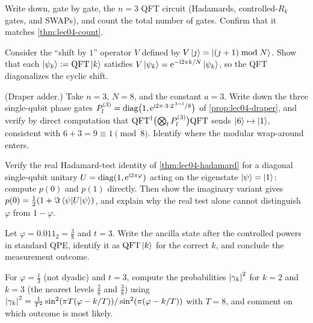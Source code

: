 \begin{exercise}\label{ex:lec04-4}
Write down, gate by gate, the $n=3$ QFT circuit (Hadamards, controlled-$R_k$
gates, and SWAPs), and count the total number of gates. Confirm that it matches
\cref{thm:lec04-count}.
\end{exercise}

\begin{exercise}\label{ex:lec04-5}
Consider the ``shift by $1$'' operator $V$ defined by
$V\ket{j}=\ket{(j+1)\bmod N}$. Show that each $\ket{\psi_k}\vcentcolon=\mathrm{QFT}\ket{k}$
satisfies $V\ket{\psi_k}=\mathrm{e}^{-\mathrm{i} 2\pi k/N}\ket{\psi_k}$, so the QFT
diagonalizes the cyclic shift.
\end{exercise}

\begin{exercise}\label{ex:lec04-draper}
(Draper adder.) Take $n=3$, $N=8$, and the constant $a=3$. Write down the three
single-qubit phase gates $P_l^{(3)}=\operatorname{diag}\bigl(1,\mathrm{e}^{\mathrm{i} 2\pi\cdot 3\cdot
2^{\,3-l}/8}\bigr)$ of \cref{prop:lec04-draper}, and verify by direct computation
that $\mathrm{QFT}^{\dagger}\bigl(\bigotimes_{l}P_l^{(3)}\bigr)\mathrm{QFT}$ sends
$\ket{6}\mapsto\ket{1}$, consistent with $6+3=9\equiv1\pmod 8$. Identify where the
modular wrap-around enters.
\end{exercise}

\begin{exercise}\label{ex:lec04-6}
Verify the real Hadamard-test identity of \cref{thm:lec04-hadamard} for a
diagonal single-qubit unitary $U=\operatorname{diag}(1,\mathrm{e}^{\mathrm{i} 2\pi\varphi})$ acting on the
eigenstate $\ket{\psi}=\ket{1}$: compute $p(0)$ and $p(1)$ directly. Then show
the imaginary variant gives $p(0)=\tfrac12(1+\Im\braket{\psi|U|\psi})$, and
explain why the real test alone cannot distinguish $\varphi$ from $1-\varphi$.
\end{exercise}

\begin{exercise}\label{ex:lec04-7}
Let $\varphi=0.011_2=\tfrac38$ and $t=3$. Write the ancilla state after the
controlled powers in standard QPE, identify it as $\mathrm{QFT}\ket{k}$ for the correct
$k$, and conclude the measurement outcome.
\end{exercise}

\begin{exercise}\label{ex:lec04-8}
For $\varphi=\tfrac13$ (not dyadic) and $t=3$, compute the probabilities
$\left\lvert \gamma_k \right\rvert^{2}$ for $k=2$ and $k=3$ (the nearest levels $\tfrac28$ and
$\tfrac38$) using $\left\lvert \gamma_k \right\rvert^{2}
=\tfrac{1}{T^{2}}\sin^{2}(\pi T(\varphi-k/T))/\sin^{2}(\pi(\varphi-k/T))$ with
$T=8$, and comment on which outcome is most likely.
\end{exercise}

